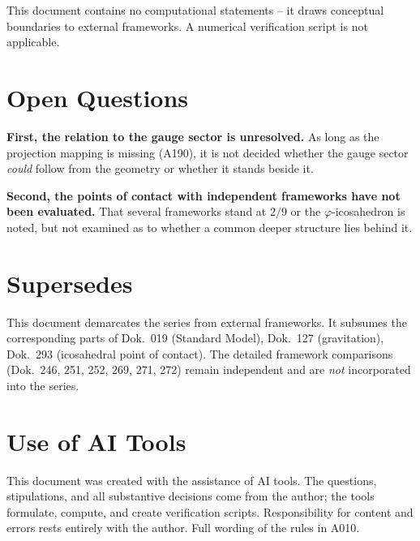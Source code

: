 This document contains no computational statements -- it draws conceptual
boundaries to external frameworks. A numerical verification script is not
applicable.

\section{Open Questions}

\textbf{First, the relation to the gauge sector is unresolved.} As long as the
projection mapping is missing (A190), it is not decided whether the gauge sector
\emph{could} follow from the geometry or whether it stands beside it.

\textbf{Second, the points of contact with independent frameworks have not been
evaluated.} That several frameworks stand at $2/9$ or the $\varphi$-icosahedron
is noted, but not examined as to whether a common deeper structure lies behind it.

\section{Supersedes}

This document demarcates the series from external frameworks. It subsumes the
corresponding parts of Dok.~019 (Standard Model), Dok.~127 (gravitation),
Dok.~293 (icosahedral point of contact). The detailed framework comparisons
(Dok.~246, 251, 252, 269, 271, 272) remain independent and are \emph{not}
incorporated into the series.

\section{Use of AI Tools}

This document was created with the assistance of AI tools. The questions,
stipulations, and all substantive decisions come from the author; the tools
formulate, compute, and create verification scripts.
Responsibility for content and errors rests entirely with the author.
Full wording of the rules in A010.
